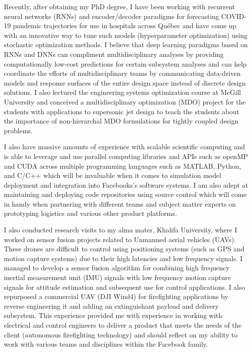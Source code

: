 \documentclass[12pt]{article} %
\begin{document}
\medskip %

Recently, after obtaining my PhD degree, I have been working with recurrent neural networks (RNNs) and encoder/decoder paradigms for forecasting COVID-19 pandemic trajectories for use in hospitals across Qu{\'e}bec and have come up with an innovative way to tune such models (hyperparameter optimization) using stochastic optimization methods. I believe that deep learning paradigms based on RNNs and DNNs can compliment multidisciplinary analyses by providing computationally low-cost predictions for certain subsystem analyses and can help coordinate the efforts of multidisciplinary teams by communicating data-driven models and response surfaces of the entire design space instead of discrete design solutions. I also lectured the engineering systems optimization course at McGill University and conceived a multidisciplinary optimization (MDO) project for the students with applications to supersonic jet design to teach the students about the importance of non-hierarchal MDO formulations for tightly coupled design problems.

\medskip %

I also have massive amounts of experience with scalable scientific computing and is able to leverage and use parallel computing libraries and APIs such as openMP and CUDA across multiple programming languages such as MATLAB, Python, and C/C++ which will be invaluable when it comes to simulation model deployment and integration into Facebooks's software systems. I am also adept at maintaining and deploying code repositories using source control which will come in handy when partnering with different teams and subject matter experts on prototyping logistics and various other product platforms.

\medskip %

I also conducted research visits to my alma mater, Khalifa University, where I worked on sensor fusion projects related to Unmanned aerial vehicles (UAVs). These drones are difficult to control using positioning systems (such as GPS and motion capture systems) due to their high latencies and low frequency signals. I managed to develop a sensor fusion algorithm for combining high frequency inertial measurement unit (IMU) signals with low frequency motion capture signals for attitude estimation and subsequent use for control applications. I also repurposed a commercial UAV (DJI Wind4) for firefighting applications by reverse engineering it and adding an extinguishant payload and delivery subsystem. This experience provided me with experience in working with electrical and control engineers to deliver a product that meets the needs of the client (autonomous firefighting technology) and should reflect on my ability to work with various teams and disciplines within the Facebook family.
\end{document}
